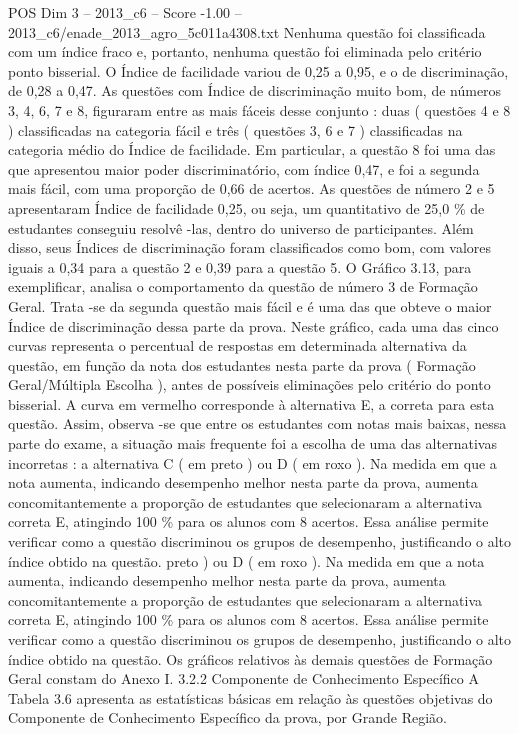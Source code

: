 \begin{textsample}{POS Dim 3 – 2013\_c6 – Score -1.00 – 2013\_c6/enade\_2013\_agro\_5c011a4308.txt}
Nenhuma questão foi classificada com um índice fraco e, portanto, nenhuma questão foi eliminada pelo critério ponto bisserial.
O Índice de facilidade variou de 0,25 a 0,95, e o de discriminação, de 0,28 a 0,47.
As questões com Índice de discriminação muito bom, de números 3, 4, 6, 7 e 8, figuraram entre as mais fáceis desse conjunto : duas ( questões 4 e 8 ) classificadas na categoria fácil e três ( questões 3, 6 e 7 ) classificadas na categoria médio do Índice de facilidade.
Em particular, a questão 8 foi uma das que apresentou maior poder discriminatório, com índice 0,47, e foi a segunda mais fácil, com uma proporção de 0,66 de acertos.
As questões de número 2 e 5 apresentaram Índice de facilidade 0,25, ou seja, um quantitativo de 25,0 \% de estudantes conseguiu resolvê -las, dentro do universo de participantes.
Além disso, seus Índices de discriminação foram classificados como bom, com valores iguais a 0,34 para a questão 2 e 0,39 para a questão 5.
O Gráfico 3.13, para exemplificar, analisa o comportamento da questão de número 3 de Formação Geral.
Trata -se da segunda questão mais fácil e é uma das que obteve o maior Índice de discriminação dessa parte da prova.
Neste gráfico, cada uma das cinco curvas representa o percentual de respostas em determinada alternativa da questão, em função da nota dos estudantes nesta parte da prova ( Formação Geral/Múltipla Escolha ), antes de possíveis eliminações pelo critério do ponto bisserial.
A curva em vermelho corresponde à alternativa E, a correta para esta questão.
Assim, observa -se que entre os estudantes com notas mais baixas, nessa parte do exame, a situação mais frequente foi a escolha de uma das alternativas incorretas : a alternativa C ( em preto ) ou D ( em roxo ).
Na medida em que a nota aumenta, indicando desempenho melhor nesta parte da prova, aumenta concomitantemente a proporção de estudantes que selecionaram a alternativa correta E, atingindo 100 \% para os alunos com 8 acertos.
Essa análise permite verificar como a questão discriminou os grupos de desempenho, justificando o alto índice obtido na questão. preto ) ou D ( em roxo ).
Na medida em que a nota aumenta, indicando desempenho melhor nesta parte da prova, aumenta concomitantemente a proporção de estudantes que selecionaram a alternativa correta E, atingindo 100 \% para os alunos com 8 acertos.
Essa análise permite verificar como a questão discriminou os grupos de desempenho, justificando o alto índice obtido na questão.
Os gráficos relativos às demais questões de Formação Geral constam do Anexo I. 3.2.2 Componente de Conhecimento Específico A Tabela 3.6 apresenta as estatísticas básicas em relação às questões objetivas do Componente de Conhecimento Específico da prova, por Grande Região.

\end{textsample}

